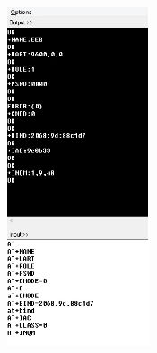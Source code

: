 \documentclass[a4 paper,12pt]{article}
\begin{document}
\begin{center}
	\graphicspath{ {images/} }
	\includegraphics[width=5cm, height=10cm]{BT-AT_Configure}
\end{center}
	
\end{document}
